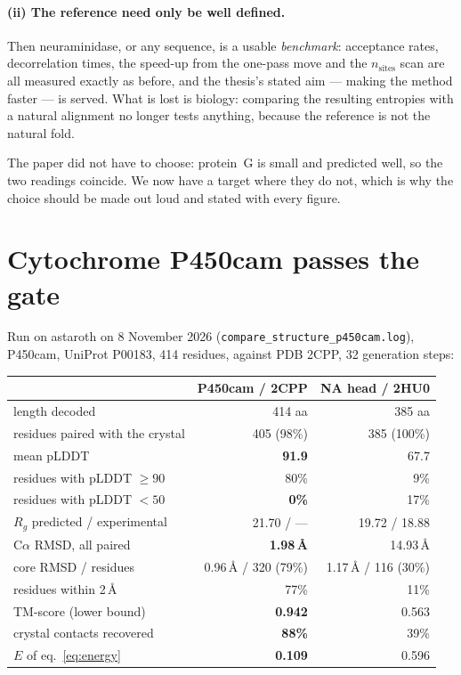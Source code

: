 \documentclass[11pt,a4paper]{article}
\newcommand{\file}[1]{\texttt{#1}}
\begin{document}
\paragraph{(ii) The reference need only be well defined.} Then neuraminidase, or
any sequence, is a usable \emph{benchmark}: acceptance rates, decorrelation
times, the speed-up from the one-pass move and the $n_{\text{sites}}$ scan are
all measured exactly as before, and the thesis's stated aim --- making the method
faster --- is served. What is lost is biology: comparing the resulting entropies
with a natural alignment no longer tests anything, because the reference is not
the natural fold.

The paper did not have to choose: protein~G is small and predicted well, so the
two readings coincide. We now have a target where they do not, which is why the
choice should be made out loud and stated with every figure.

\section{Cytochrome P450cam passes the gate}\label{sec:p450}

Run on astaroth on 8 November 2026 (\file{compare\_structure\_p450cam.log}),
P450cam, UniProt P00183, 414 residues, against PDB 2CPP, 32 generation steps:

\begin{center}
\begin{tabular}{lrr}
\toprule
 & P450cam / 2CPP & NA head / 2HU0 \\
\midrule
length decoded                    & 414 aa          & 385 aa \\
residues paired with the crystal  & 405 (98\%)      & 385 (100\%) \\
mean pLDDT                        & \textbf{91.9}   & 67.7 \\
residues with pLDDT $\ge 90$      & 80\%            & 9\% \\
residues with pLDDT $< 50$        & \textbf{0\%}    & 17\% \\
$R_g$ predicted / experimental    & 21.70 / ---     & 19.72 / 18.88 \\
C$\alpha$ RMSD, all paired        & \textbf{1.98\,\AA} & 14.93\,\AA \\
core RMSD / residues              & 0.96\,\AA{} / 320 (79\%) & 1.17\,\AA{} / 116 (30\%) \\
residues within 2\,\AA            & 77\%            & 11\% \\
TM-score (lower bound)            & \textbf{0.942}  & 0.563 \\
crystal contacts recovered        & \textbf{88\%}   & 39\% \\
$E$ of eq.~\eqref{eq:energy}      & \textbf{0.109}  & 0.596 \\
\bottomrule
\end{tabular}
\end{center}
\end{document}
